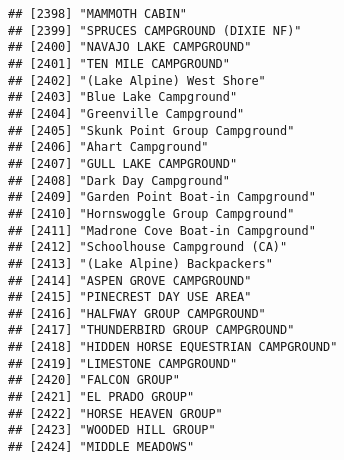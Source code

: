 \documentclass[
]{article}
\begin{document}
\begin{verbatim}
## [2398] "MAMMOTH CABIN"                                                                       
## [2399] "SPRUCES CAMPGROUND (DIXIE NF)"                                                       
## [2400] "NAVAJO LAKE CAMPGROUND"                                                              
## [2401] "TEN MILE CAMPGROUND"                                                                 
## [2402] "(Lake Alpine) West Shore"                                                            
## [2403] "Blue Lake Campground"                                                                
## [2404] "Greenville Campground"                                                               
## [2405] "Skunk Point Group Campground"                                                        
## [2406] "Ahart Campground"                                                                    
## [2407] "GULL LAKE CAMPGROUND"                                                                
## [2408] "Dark Day Campground"                                                                 
## [2409] "Garden Point Boat-in Campground"                                                     
## [2410] "Hornswoggle Group Campground"                                                        
## [2411] "Madrone Cove Boat-in Campground"                                                     
## [2412] "Schoolhouse Campground (CA)"                                                         
## [2413] "(Lake Alpine) Backpackers"                                                           
## [2414] "ASPEN GROVE CAMPGROUND"                                                              
## [2415] "PINECREST DAY USE AREA"                                                              
## [2416] "HALFWAY GROUP CAMPGROUND"                                                            
## [2417] "THUNDERBIRD GROUP CAMPGROUND"                                                        
## [2418] "HIDDEN HORSE EQUESTRIAN CAMPGROUND"                                                  
## [2419] "LIMESTONE CAMPGROUND"                                                                
## [2420] "FALCON GROUP"                                                                        
## [2421] "EL PRADO GROUP"                                                                      
## [2422] "HORSE HEAVEN GROUP"                                                                  
## [2423] "WOODED HILL GROUP"                                                                   
## [2424] "MIDDLE MEADOWS"                                                                      

\end{verbatim}
\end{document}
